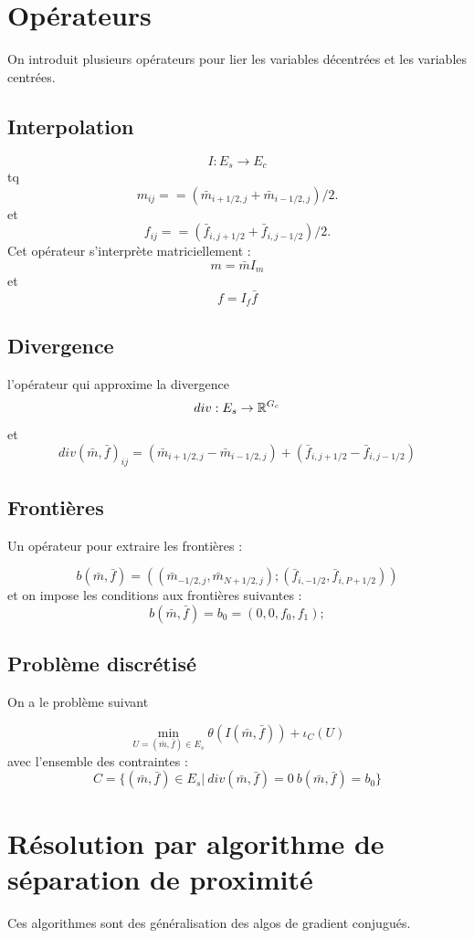 \documentclass[a4paper,12pt]{article}
\begin{document}
\section{Opérateurs}
On introduit plusieurs opérateurs pour lier les variables décentrées et les variables centrées.
\subsection{Interpolation}
$$
I:E_s \rightarrow E_c
$$
tq 
$$
m_{ij} = = (\bar{m}_{i+1/2,j}+\bar{m}_{i-1/2,j})/2.
$$
et
$$
f_{ij} = = (\bar{f}_{i,j+1/2}+\bar{f}_{i,j-1/2})/2.
$$
Cet opérateur s'interprète matriciellement : 
$$
m = \bar{m}I_m
$$
et 
$$
f = I_f\bar{f}
$$

\subsection{Divergence}
l'opérateur qui approxime la divergence
$$
div : E_s\rightarrow \mathbb{R}^{G_c}
$$
et 
$$
div(\bar{m},\bar{f})_{ij} = (\bar{m}_{i+1/2,j}-\bar{m}_{i-1/2,j}) + (\bar{f}_{i,j+1/2}-\bar{f}_{i,j-1/2})
$$

\subsection{Frontières}
Un opérateur pour extraire les frontières : 

$$
b(\bar{m},\bar{f}) = ((\bar{m}_{-1/2,j},\bar{m}_{N+1/2,j});(\bar{f}_{i,-1/2},\bar{f}_{i,P+1/2}))
$$
et on impose les conditions aux frontières suivantes : 
$$
b(\bar{m},\bar{f}) = b_0=(0,0,f_0,f_1);
$$

\subsection{Problème discrétisé}

On a le problème suivant 

$$
\min_{U=(\bar{m},\bar{f})\in E_s} \theta(I(\bar{m},\bar{f})) + \iota_C(U)
$$
avec l'ensemble des contraintes :
$$
C=\{(\bar{m},\bar{f})\in E_s|\ div(\bar{m},\bar{f}) = 0\ b(\bar{m},\bar{f}) = b_0 \}
$$

\section{Résolution par algorithme de séparation de proximité}
Ces algorithmes sont des généralisation des algos de gradient conjugués. \\
\end{document}
